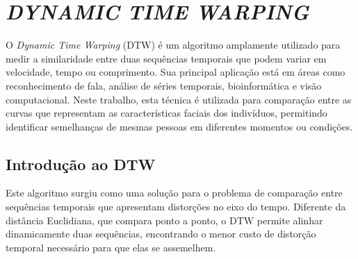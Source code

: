 \chapter{\textit{DYNAMIC TIME WARPING}} \label{cha:dtw}

O \textit{Dynamic Time Warping} (DTW) é um algoritmo amplamente utilizado para medir a similaridade entre duas sequências temporais que podem variar em velocidade, tempo ou comprimento. Sua principal aplicação está em áreas como reconhecimento de fala, análise de séries temporais, bioinformática e visão computacional. Neste trabalho, esta técnica é utilizada para comparação entre as curvas que representam as características faciais dos indivíduos, permitindo identificar semelhanças de mesmas pessoas em diferentes momentos ou condições.

\section{Introdução ao DTW}

Este algoritmo surgiu como uma solução para o problema de comparação entre sequências temporais que apresentam distorções no eixo do tempo. Diferente da distância Euclidiana, que compara ponto a ponto, o DTW permite alinhar dinamicamente duas sequências, encontrando o menor custo de distorção temporal necessário para que elas se assemelhem.



